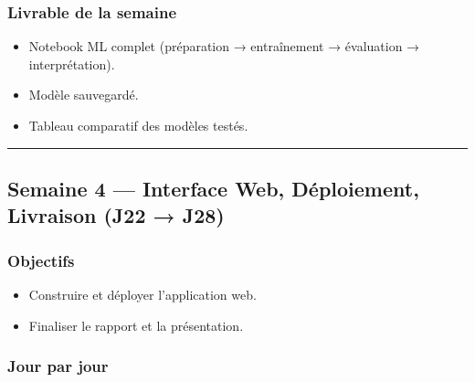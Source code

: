 \documentclass[11pt,a4paper]{article}
\providecommand{\tightlist}{\setlength{\itemsep}{0pt}\setlength{\parskip}{0pt}}
\begin{document}
\subsubsection{Livrable de la semaine}\label{livrable-de-la-semaine-2}

\begin{itemize}
\tightlist
\item
  Notebook ML complet (préparation → entraînement → évaluation →
  interprétation).
\item
  Modèle sauvegardé.
\item
  Tableau comparatif des modèles testés.
\end{itemize}

\begin{center}\rule{0.5\linewidth}{0.5pt}\end{center}

\subsection{Semaine 4 --- Interface Web, Déploiement, Livraison (J22 →
J28)}\label{semaine-4-interface-web-duxe9ploiement-livraison-j22-j28}

\subsubsection{Objectifs}\label{objectifs-3}

\begin{itemize}
\tightlist
\item
  Construire et déployer l'application web.
\item
  Finaliser le rapport et la présentation.
\end{itemize}

\subsubsection{Jour par jour}\label{jour-par-jour-3}
\end{document}
